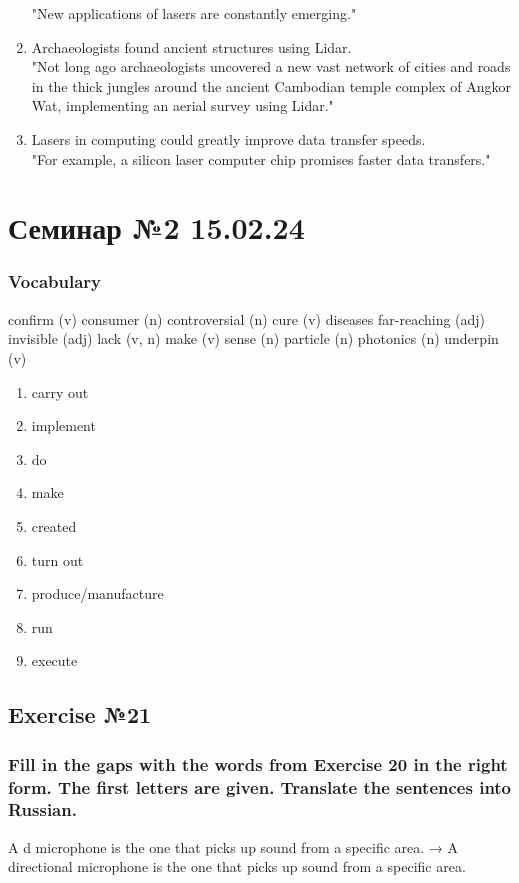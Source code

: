 \begin{enumerate}
            "New applications of lasers are constantly emerging."
      \item Archaeologists found ancient structures using Lidar. \\
            "Not long ago archaeologists uncovered a new vast network of cities and
            roads in the thick jungles around the ancient Cambodian temple complex
            of Angkor Wat, implementing an aerial survey using Lidar."
      \item Lasers in computing could greatly improve data transfer speeds. \\
            "For example, a silicon laser computer chip promises faster data
            transfers." 
\end{enumerate}

\chapter{Семинар №2 15.02.24}

\subsection*{Vocabulary}

confirm (v)
consumer (n)
controversial (n)
cure (v) diseases
far-reaching (adj)
invisible (adj)
lack (v, n)
make (v) sense (n)
particle (n)
photonics (n)
underpin (v)

\begin{enumerate}
      \item carry out
      \item implement
      \item do
      \item make
      \item created
      \item turn out
      \item produce/manufacture
      \item run
      \item execute
\end{enumerate}

\section{Exercise №21}
\subsection*{Fill in the gaps with the words from Exercise 20 in the right form. The
      first letters are given. Translate the sentences into Russian.}
A d\underline{\hspace{2cm}} microphone is the one that picks up
sound from a specific area. → A directional microphone is the one that picks up sound
from a specific area.

